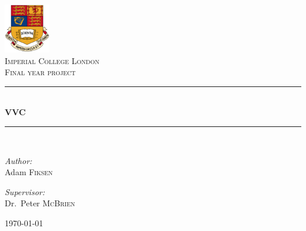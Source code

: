 \documentclass[a4paper, 11pt, twoside]{report}
\newcommand{\HRule}{\rule{\linewidth}{0.5mm}}
\begin{document}
\begin{titlepage}
\begin{center}

\includegraphics[width=0.15\textwidth]{Figures/logo}~\\[1cm]

\textsc{\LARGE Imperial College London}\\[1.5cm]

\textsc{\Large Final year project}\\[0.5cm]

\HRule \\[0.4cm]
{ \huge \bfseries VVC \\[0.4cm] }

\HRule \\[1.5cm]

\begin{minipage}{0.4\textwidth}
\begin{flushleft} \large
\emph{Author:}\\
Adam \textsc{Fiksen}
\end{flushleft}
\end{minipage}
\begin{minipage}{0.4\textwidth}
\begin{flushright} \large
\emph{Supervisor:} \\
Dr.~Peter \textsc{McBrien}
\end{flushright}
\end{minipage}

\vfill

{\large \today}

\end{center}
\end{titlepage}

%
%

\tableofcontents



 






\end{document}
